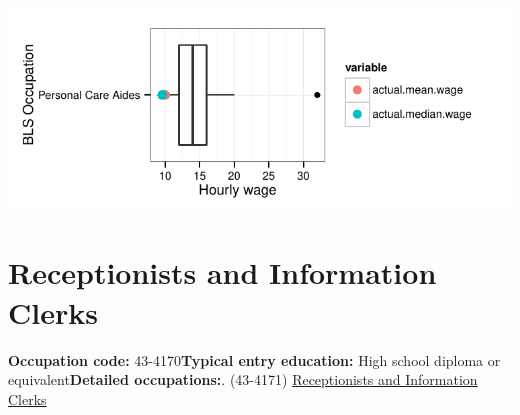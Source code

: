 \documentclass[a4paper,10pt]{article}\usepackage[]{graphicx}\usepackage[]{color}
\makeatletter
\def\maxwidth{ %
  \ifdim\Gin@nat@width>\linewidth
    \linewidth
  \else
    \Gin@nat@width
  \fi
}
\makeatother
\begin{document}
{\centering \includegraphics[width=\maxwidth]{figure/unnamed-chunk-229} 

}


\newpage\section{Receptionists and Information Clerks}\textbf{Occupation code:} 43-4170\newline\textbf{Typical entry education:} High school diploma or equivalent\newline\textbf{Detailed occupations:}. (43-4171)  \href{http://www.bls.gov/oes/current/oes434171.htm}{Receptionists and Information Clerks}\newline%
\end{document}
